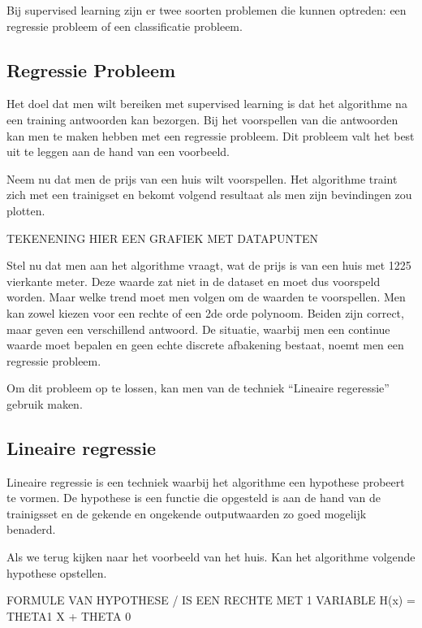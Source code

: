 Bij supervised learning zijn er twee soorten problemen die kunnen optreden: een regressie probleem of een classificatie probleem.

\subsection{Regressie Probleem}\label{Regressie Probleem}

Het doel dat men wilt bereiken met supervised learning is dat het algorithme na een training antwoorden kan bezorgen. Bij het voorspellen van die antwoorden kan men te maken hebben met een regressie probleem. Dit probleem valt het best uit te leggen aan de hand van een voorbeeld.

Neem nu dat men de prijs van een huis wilt voorspellen.
Het algorithme traint zich met een trainigset en bekomt volgend resultaat als men zijn bevindingen zou plotten.

\newline
TEKENENING HIER EEN GRAFIEK MET DATAPUNTEN 
\newline

Stel nu dat men aan het algorithme vraagt, wat de prijs is van een huis met 1225 vierkante meter. Deze waarde zat niet in de dataset en moet dus voorspeld worden.  Maar welke trend moet men volgen om de waarden te voorspellen. Men kan zowel kiezen voor een rechte of een 2de orde polynoom. Beiden zijn correct, maar geven een verschillend antwoord. De situatie, waarbij men een continue waarde moet bepalen en geen echte discrete afbakening bestaat, noemt men een regressie probleem.

Om dit probleem op te lossen, kan men van de techniek ``Lineaire regeressie'' gebruik maken.

\subsection{Lineaire regressie}\label{Lineaire regressie}

Lineaire regressie is een techniek waarbij het algorithme een hypothese probeert te vormen. De hypothese is een functie die opgesteld is aan de hand van de trainigsset en de gekende en ongekende outputwaarden zo goed mogelijk benaderd.

Als we terug kijken naar het voorbeeld van het huis. Kan het algorithme volgende hypothese opstellen.

\newline 
FORMULE VAN HYPOTHESE / IS EEN RECHTE MET 1 VARIABLE H(x) = THETA1 X + THETA 0
\newline

